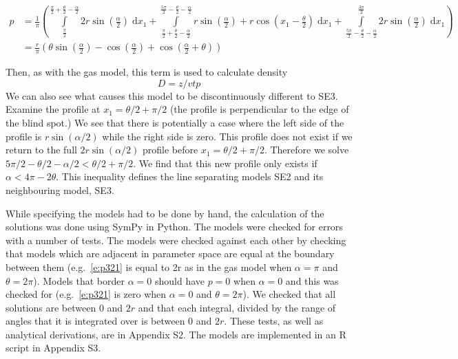 \documentclass[a4paper,10pt,reqno,oneside]{amsart}
\begin{document}
\begin{align}
    p &=\frac{1}{\pi} \left(\int\limits_{\frac{\pi}{2}}^{\frac{\pi}{2} + \frac{\theta}{2} - \frac{\alpha}{2}}2 r \sin{\left (\frac{\alpha}{2} \right )}\;\mathrm{d}x_1+\int\limits_{\frac{\pi}{2} + \frac{\theta}{2} - \frac{\alpha}{2}}^{\frac{5 \pi}{2} - \frac{\theta}{2} - \frac{\alpha}{2}}r \sin{\left (\frac{\alpha}{2} \right )} + r \cos{\left (x_1 - \frac{\theta}{2} \right )}\;\mathrm{d}x_1+\int\limits_{\frac{5 \pi}{2} - \frac{\theta}{2} - \frac{\alpha}{2}}^{\frac{3 \pi}{2}}2 r \sin{\left (\frac{\alpha}{2} \right )}\;\mathrm{d}x_1\right) \nonumber  \\
     &= \frac{r}{\pi} \left(\theta \sin{\left (\frac{\alpha}{2} \right )} - \cos{\left (\frac{\alpha}{2} \right )} + \cos{\left (\frac{\alpha}{2} + \theta \right )}\right) \label{e:p321}
\end{align}

Then, as with the gas model, this term is used to calculate density
\begin{equation}
\label{e:gas}
D = z/vtp
\end{equation}
We can also see what causes this model to be discontinuously different to SE3. Examine the profile at $x_1 = 	\theta/2 + \pi/2$ (the profile is perpendicular to the edge of the blind spot.) We see that there is potentially a case where the left side of the profile is $r\sin( \alpha/2)$ while the right side is zero. This profile does not exist if we return to the full $2r\sin( \alpha/2)$ profile before $x_1  = \theta/2 + \pi/2$. Therefore we solve $5\pi/2 - \theta/2 - \alpha/2 <  \theta/2 + \pi/2$. We find that this new profile only exists if $ \alpha < 4\pi - 2 \theta$. This inequality defines the line separating models SE2 and its neighbouring model, SE3.

While specifying the models had to be done by hand, the calculation of the solutions was done using SymPy \citep{sympy} in Python. The models were checked for errors with a number of tests. The models were checked against each other by checking that models which are adjacent in parameter space are equal at the boundary between them (e.g.~\ref{e:p321} is equal to 2r as in the gas model when $\alpha=\pi$ and $\theta=2\pi$). Models that border $ \alpha = 0$ should have $p = 0$ when $ \alpha = 0$ and this was checked for (e.g.~\ref{e:p321} is zero when $\alpha=0$ and $\theta=2\pi$). We checked that all solutions are between 0 and $2r$ and that each integral, divided by the range of angles that it is integrated over is between 0 and $2r$. These tests, as well as analytical derivations, are in Appendix S2. The models are implemented in an R script in Appendix S3. 
\end{document}

